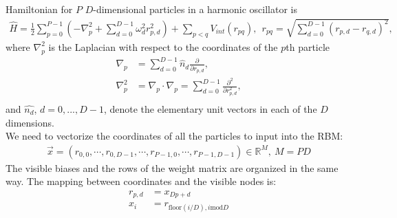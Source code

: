 \documentclass[12pt]{article}
\begin{document}
\noindent Hamiltonian for $P$ $D$-dimensional particles in a harmonic oscillator is
\begin{align*}
\hat{H} = \frac{1}{2} \sum_{p = 0}^{P-1} \left( -\nabla_p^2 + \sum_{d=0}^{D-1} \omega_d^2 r_{p,d}^2 \right) + \sum_{p<q} V_{int} (r_{pq}), \ \ r_{pq} = \sqrt{ \sum_{d=0}^{D-1} (r_{p,d}-r_{q,d})^2 },
\end{align*}
\noindent where $\nabla_p^2$ is the Laplacian with respect to the coordinates of the $p$th particle
\begin{align*}
\nabla_p &= \sum_{d=0}^{D-1} \hat{n}_d \frac{\partial}{\partial r_{p,d}},\\
\nabla_p^2 &= \nabla_p \cdot \nabla_p = \sum_{d=0}^{D-1} \frac{\partial^2}{\partial r_{p,d}^2},\\
\end{align*}
\noindent and $\hat{n_d}$, $d = 0, ..., D-1$, denote the elementary unit vectors in each of the $D$ dimensions.\\


\noindent We need to vectorize the coordinates of all the particles to input into the RBM:
\begin{align*}
\vec{x} = ( r_{0,0}, \cdots, r_{0,D-1}, \cdots, r_{P-1,0}, \cdots, r_{P-1,D-1} ) \in \mathbb{R}^M, \ M = PD
\end{align*}
\noindent The visible biases and the rows of the weight matrix are organized in the same way. The mapping between coordinates and the visible nodes is:
\begin{align*}
r_{p,d} &= x_{Dp+d}\\
x_i &= r_{\text{floor}(i/D), i \text{mod} D}
\end{align*}
\end{document}
